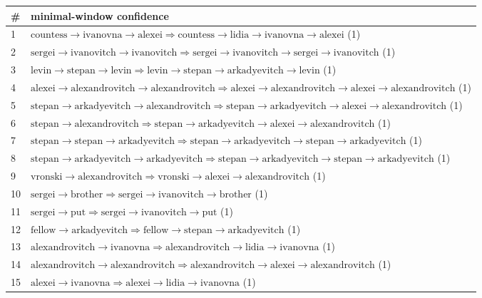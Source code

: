 \begin{appendices}
\begin{longtable}{p{20pt}|p{\dimexpr\textwidth-20pt-\tabcolsep\relax}}
\# & minimal-window confidence \\
\hline
1 & $ \text{countess} \to \text{ivanovna} \to \text{alexei} \Rightarrow \text{countess} \to \text{lidia} \to \text{ivanovna} \to \text{alexei} $ (1) \\
2 & $ \text{sergei} \to \text{ivanovitch} \to \text{ivanovitch} \Rightarrow \text{sergei} \to \text{ivanovitch} \to \text{sergei} \to \text{ivanovitch} $ (1) \\
3 & $ \text{levin} \to \text{stepan} \to \text{levin} \Rightarrow \text{levin} \to \text{stepan} \to \text{arkadyevitch} \to \text{levin} $ (1) \\
4 & $ \text{alexei} \to \text{alexandrovitch} \to \text{alexandrovitch} \Rightarrow \text{alexei} \to \text{alexandrovitch} \to \text{alexei} \to \text{alexandrovitch} $ (1) \\
5 & $ \text{stepan} \to \text{arkadyevitch} \to \text{alexandrovitch} \Rightarrow \text{stepan} \to \text{arkadyevitch} \to \text{alexei} \to \text{alexandrovitch} $ (1) \\
6 & $ \text{stepan} \to \text{alexandrovitch} \Rightarrow \text{stepan} \to \text{arkadyevitch} \to \text{alexei} \to \text{alexandrovitch} $ (1) \\
7 & $ \text{stepan} \to \text{stepan} \to \text{arkadyevitch} \Rightarrow \text{stepan} \to \text{arkadyevitch} \to \text{stepan} \to \text{arkadyevitch} $ (1) \\
8 & $ \text{stepan} \to \text{arkadyevitch} \to \text{arkadyevitch} \Rightarrow \text{stepan} \to \text{arkadyevitch} \to \text{stepan} \to \text{arkadyevitch} $ (1) \\
9 & $ \text{vronski} \to \text{alexandrovitch} \Rightarrow \text{vronski} \to \text{alexei} \to \text{alexandrovitch} $ (1) \\
10 & $ \text{sergei} \to \text{brother} \Rightarrow \text{sergei} \to \text{ivanovitch} \to \text{brother} $ (1) \\
11 & $ \text{sergei} \to \text{put} \Rightarrow \text{sergei} \to \text{ivanovitch} \to \text{put} $ (1) \\
12 & $ \text{fellow} \to \text{arkadyevitch} \Rightarrow \text{fellow} \to \text{stepan} \to \text{arkadyevitch} $ (1) \\
13 & $ \text{alexandrovitch} \to \text{ivanovna} \Rightarrow \text{alexandrovitch} \to \text{lidia} \to \text{ivanovna} $ (1) \\
14 & $ \text{alexandrovitch} \to \text{alexandrovitch} \Rightarrow \text{alexandrovitch} \to \text{alexei} \to \text{alexandrovitch} $ (1) \\
15 & $ \text{alexei} \to \text{ivanovna} \Rightarrow \text{alexei} \to \text{lidia} \to \text{ivanovna} $ (1) \\
\end{longtable}


\end{appendices}

